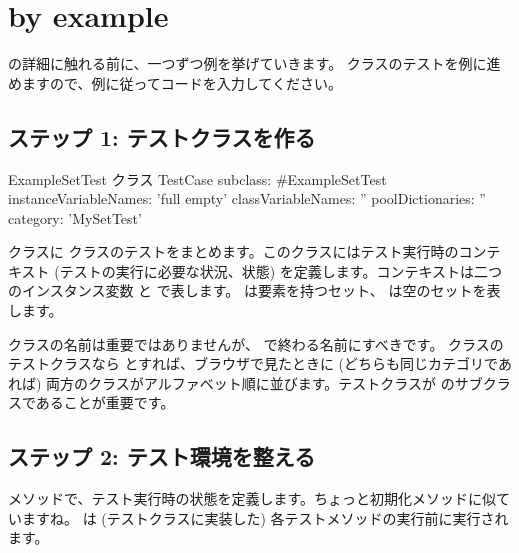 \documentclass[a4paper,10pt,twoside]{book}
\begin{document}
\section{\sunit by example}

\SUnit の詳細に触れる前に、一つずつ例を挙げていきます。  クラスのテストを例に進めますので、例に従ってコードを入力してください。

\subsection{ステップ 1: テストクラスを作る}


\begin{classdef}[exampleSetTest]{ExampleSetTest クラス}
TestCase subclass: #ExampleSetTest
	instanceVariableNames: 'full empty'
	classVariableNames: ''
	poolDictionaries: ''
	category: 'MySetTest'
\end{classdef}

 クラスに  クラスのテストをまとめます。このクラスにはテスト実行時のコンテキスト (テストの実行に必要な状況、状態) を定義します。コンテキストは二つのインスタンス変数  と  で表します。  は要素を持つセット、  は空のセットを表します。

クラスの名前は重要ではありませんが、  で終わる名前にすべきです。  クラスのテストクラスなら  とすれば、ブラウザで見たときに (どちらも同じカテゴリであれば) 両方のクラスがアルファベット順に並びます。テストクラスが  のサブクラスであることが重要です。

\subsection{ステップ 2: テスト環境を整える}

 メソッドで、テスト実行時の状態を定義します。ちょっと初期化メソッドに似ていますね。  は (テストクラスに実装した) 各テストメソッドの実行前に実行されます。


\end{document}
